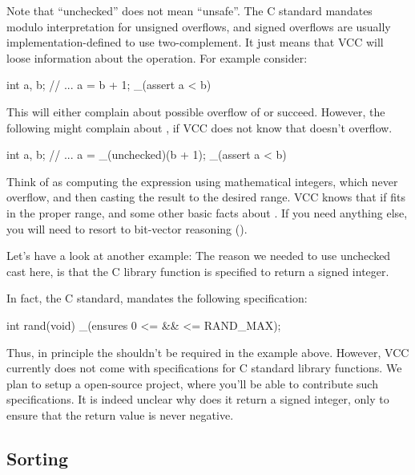 {{Note that ``unchecked'' does not mean ``unsafe''.
The C standard mandates modulo interpretation for unsigned overflows,
and signed overflows are usually implementation-defined to use two-complement.
It just means that VCC will loose information about the operation.
For example consider:
\begin{VCC}
int a, b;
// ...
a = b + 1;
_(assert a < b)
\end{VCC}
This will either complain about possible overflow of  or succeed.
However, the following might complain about , if VCC does not know
that  doesn't overflow.
\begin{VCC}
int a, b;
// ...
a = _(unchecked)(b + 1);
_(assert a < b)
\end{VCC}
Think of  as computing the expression using mathematical 
integers, which never overflow, and then casting the result to the desired range.
VCC knows that  if  fits in the proper range,
and some other basic facts about .
If you need anything else, you will need to resort to bit-vector
reasoning ().

Let's have a look at another example:
\noindent
The reason we needed to use unchecked cast here, is that the C library
 function is specified to return a signed integer.

\begin{note}
In fact, the C standard, mandates the following specification:
\begin{VCC}
int rand(void)
  _(ensures 0 <= \result && \result <= RAND_MAX);
\end{VCC}
Thus, in principle the  shouldn't be required in the
example above. 
However,
VCC currently does not come with specifications for C standard library functions.
We plan to setup a open-source project, where you'll be able to contribute such
specifications.
It is indeed unclear why does it return a signed integer, only to ensure that the return value
is never negative.
\end{note}

\subsection{Sorting}
\label{sect:sorting}

%

}}
